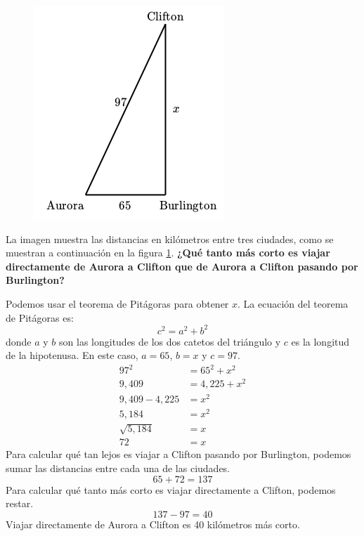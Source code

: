 \begin{figure}
    \centering
    \includegraphics[width=\linewidth]{../images/proverb_pitagoras_04.png}
    \caption{}
    \label{fig:proverb_pitagoras_04}
\end{figure}
La imagen muestra las distancias en kilómetros entre tres ciudades, como se muestran a continuación en la figura \ref{fig:proverb_pitagoras_04}.
\textbf{¿Qué tanto más corto es viajar directamente de Aurora a Clifton que de Aurora a Clifton pasando por Burlington?}\\
\vspace{5cm}

\begin{solutionbox}{8.5cm}\footnotesize
    Podemos usar el teorema de Pitágoras para obtener $x$.
    La ecuación del teorema de Pitágoras es:
    \[c^2=a^2+b^2\]
    donde $a$ y $b$ son las longitudes de los dos catetos del triángulo y $c$ es la longitud de la hipotenusa.
    En este caso, $a=65$, $b=x$ y $c=97$.
    \begin{align*}
        97^2         & =65^2+x^2     \\
        9,409        & = 4,225 + x^2 \\
        9,409-4,225  & =x^2          \\
        5,184        & =x^2          \\
        \sqrt{5,184} & =x            \\
        72           & = x
    \end{align*}
    Para calcular qué tan lejos es viajar a Clifton pasando por Burlington, podemos sumar las distancias entre cada una de las ciudades.
    \[65+72=137\]
    Para calcular qué tanto más corto es viajar directamente a Clifton, podemos restar.
    \[137-97=40\]
    Viajar directamente de Aurora a Clifton es 40 kilómetros más corto.
\end{solutionbox}